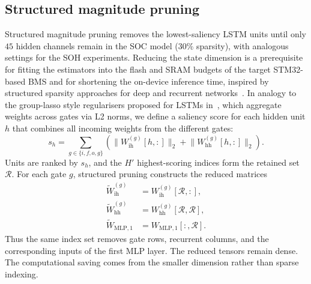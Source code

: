 \documentclass[review]{elsarticle}
\begin{document}
\subsection{Structured magnitude pruning}
Structured magnitude pruning removes the lowest-saliency LSTM units until only $45$ hidden channels remain in the SOC model (30\% sparsity), with analogous settings for the SOH experiments. Reducing the state dimension is a prerequisite for fitting the estimators into the flash and SRAM budgets of the target STM32-based BMS and for shortening the on-device inference time, inspired by structured sparsity approaches for deep and recurrent networks~\cite{wenLearningStructuredSparsity2016,lobachevaStructuredSparsificationGated2020,narangExploringSparsityRecurrent2017}. In analogy to the group-lasso style regularisers proposed for LSTMs in~\cite{wenLearningStructuredSparsity2016,lobachevaStructuredSparsificationGated2020}, which aggregate weights across gates via L2 norms, we define a saliency score for each hidden unit $h$ that combines all incoming weights from the different gates:
\begin{equation}
    \label{eq:pruning_saliency}
    s_h = \sum_{g\in\{i,f,o,g\}} \left(\lVert W_{\mathrm{ih}}^{(g)}[h,:]\rVert_2 + \lVert W_{\mathrm{hh}}^{(g)}[h,:]\rVert_2\right).
\end{equation}
Units are ranked by $s_h$, and the $H'$ highest-scoring indices form the retained set $\mathcal{R}$. For each gate $g$, structured pruning constructs the reduced matrices
\begin{align}
    \widetilde{W}_{\mathrm{ih}}^{(g)} &= W_{\mathrm{ih}}^{(g)}[\mathcal{R},:],\nonumber\\
    \widetilde{W}_{\mathrm{hh}}^{(g)} &= W_{\mathrm{hh}}^{(g)}[\mathcal{R},\mathcal{R}],\nonumber\\
    \widetilde{W}_{\mathrm{MLP},1} &= W_{\mathrm{MLP},1}[:,\mathcal{R}].
    \label{eq:pruning_slicing}
\end{align}
Thus the same index set removes gate rows, recurrent columns, and the corresponding inputs of the first MLP layer. The reduced tensors remain dense. The computational saving comes from the smaller dimension rather than sparse indexing.
\end{document}

